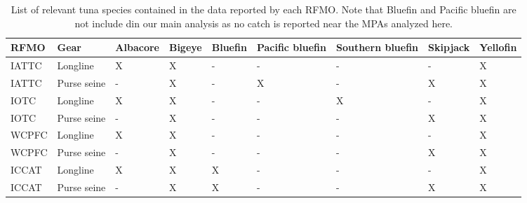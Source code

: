 \begin{table}

\caption{\label{tab:rfmo_spp}List of relevant tuna species contained in the data reported by each RFMO. Note that Bluefin and Pacific bluefin are not include din our main analysis as no catch is reported near the MPAs analyzed here.}
\centering
\begin{tabular}[t]{lllllllll}
\toprule
RFMO & Gear & Albacore & Bigeye & Bluefin & Pacific bluefin & Southern bluefin & Skipjack & Yellofin\\
\midrule
IATTC & Longline & X & X & - & - & - & - & X\\
IATTC & Purse seine & - & X & - & X & - & X & X\\
IOTC & Longline & X & X & - & - & X & - & X\\
IOTC & Purse seine & - & X & - & - & - & X & X\\
WCPFC & Longline & X & X & - & - & - & - & X\\
\addlinespace
WCPFC & Purse seine & - & X & - & - & - & X & X\\
ICCAT & Longline & X & X & X & - & - & - & X\\
ICCAT & Purse seine & - & X & X & - & - & X & X\\
\bottomrule
\end{tabular}
\end{table}